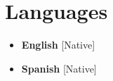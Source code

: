 \documentclass[11pt,a4paper,sans]{moderncv}
\begin{document}
\section{Languages}
\begin{multicols}{2}
    \begin{itemize}[label=\textbullet]
    \item \textbf{English} [Native]
    \item {\textbf{Spanish} [Native]}

    \end{itemize}
\end{multicols}
\end{document}
